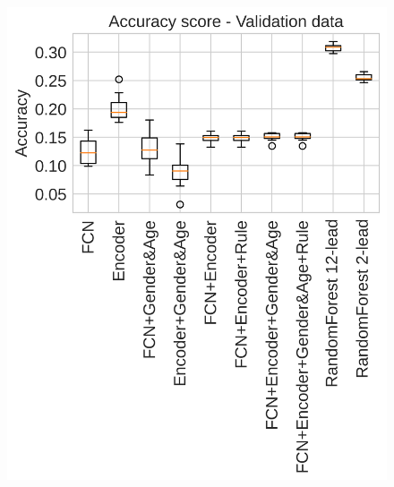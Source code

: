 \begin{figure}[ht]
{\begin{minipage}[c][1\width]{
	   0.5\textwidth}
	   \includegraphics[width=1.0\textwidth]{Figures/Accuracy_score_val}
	   \vspace{4em}
	\end{minipage}}
\end{figure}
\newline
